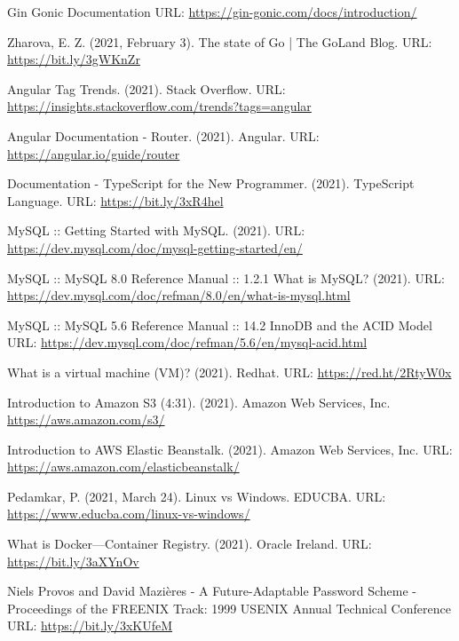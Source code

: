 \begin{thebibliography}{00}
 Gin Gonic Documentation
\newline
URL: \url{https://gin-gonic.com/docs/introduction/}

 Zharova, E. Z. (2021, February 3). The state of Go | The GoLand Blog.
\newline
URL: \url{https://bit.ly/3gWKnZr}

 Angular Tag Trends. (2021). Stack Overflow.
\newline
URL: \url{https://insights.stackoverflow.com/trends?tags=angular}

 Angular Documentation - Router. (2021). Angular. 
\newline
URL: \url{https://angular.io/guide/router}

 Documentation - TypeScript for the New Programmer. (2021). TypeScript Language.
\newline
URL: \url{https://bit.ly/3xR4hel}

 MySQL :: Getting Started with MySQL. (2021).
\newline
URL: \url{https://dev.mysql.com/doc/mysql-getting-started/en/}

 MySQL :: MySQL 8.0 Reference Manual :: 1.2.1 What is MySQL? (2021).
\newline
URL: \url{https://dev.mysql.com/doc/refman/8.0/en/what-is-mysql.html}

 MySQL :: MySQL 5.6 Reference Manual :: 14.2 InnoDB and the ACID Model
\newline
URL: \url{https://dev.mysql.com/doc/refman/5.6/en/mysql-acid.html}

 What is a virtual machine (VM)? (2021). Redhat.
\newline
URL: \url{https://red.ht/2RtyW0x}

 Introduction to Amazon S3 (4:31). (2021). Amazon Web Services, Inc.
\newline
\url{https://aws.amazon.com/s3/}

 Introduction to AWS Elastic Beanstalk. (2021). Amazon Web Services, Inc. 
\newline 
URL: \url{https://aws.amazon.com/elasticbeanstalk/}

 Pedamkar, P. (2021, March 24). Linux vs Windows. EDUCBA.
\newline
URL: \url{https://www.educba.com/linux-vs-windows/}

 What is Docker—Container Registry. (2021). Oracle Ireland.
\newline
URL: \url{https://bit.ly/3aXYnOv}

 Niels Provos and David Mazières - A Future-Adaptable Password Scheme - Proceedings of the FREENIX Track: 1999 USENIX Annual Technical Conference
\newline
URL: \url{https://bit.ly/3xKUfeM}

\end{thebibliography}